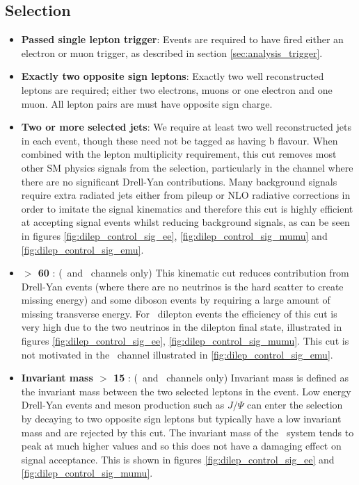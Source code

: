 \subsection*{Selection}
\begin{itemize}

  \item \textbf{Passed single lepton trigger}: Events are required to have fired either an electron or muon trigger, as described in section \ref{sec:analysis_trigger}.

  \item \textbf{Exactly two opposite sign leptons}: Exactly two well reconstructed leptons are required; either two electrons, muons or one electron and one muon. All lepton pairs are must have opposite sign charge.

  \item \textbf{Two or more selected jets}: We require at least two well reconstructed jets in each event, though these need not be tagged as having b flavour. When combined with the lepton multiplicity requirement, this cut removes most other SM physics signals from the selection, particularly in the \emu channel where there are no significant Drell-Yan contributions. Many background signals require extra radiated jets either from pileup or NLO radiative corrections in order to imitate the signal kinematics and therefore this cut is highly efficient at accepting signal events whilst reducing background signals, as can be seen in figures \ref{fig:dilep_control_sig_ee}, \ref{fig:dilep_control_sig_mumu} and \ref{fig:dilep_control_sig_emu}.

  \item \textbf{\etmiss $>$ 60 \GeV}: (\ee\ and \mumu\ channels only) This kinematic cut reduces contribution from Drell-Yan events (where there are no neutrinos is the hard scatter to create missing energy) and some diboson events by requiring a large amount of missing transverse energy. For \ttbar\ dilepton events the efficiency of this cut is very high due to the two neutrinos in the dilepton final state, illustrated in figures \ref{fig:dilep_control_sig_ee}, \ref{fig:dilep_control_sig_mumu}. This cut is not motivated in the \emu\ channel illustrated in \ref{fig:dilep_control_sig_emu}.

  \item \textbf{Invariant mass $>$ 15 \GeV}: (\ee\ and \mumu\ channels only)  Invariant mass is defined as the invariant mass between the two selected leptons in the event. Low energy Drell-Yan events and meson production such as $J/\Psi$ can enter the selection by decaying to two opposite sign leptons but typically have a low invariant mass and are rejected by this cut. The invariant mass of the \ttbar\ system tends to peak at much higher values and so this does not have a damaging effect on signal acceptance. This is shown in figures \ref{fig:dilep_control_sig_ee} and \ref{fig:dilep_control_sig_mumu}. 


\end{itemize}
